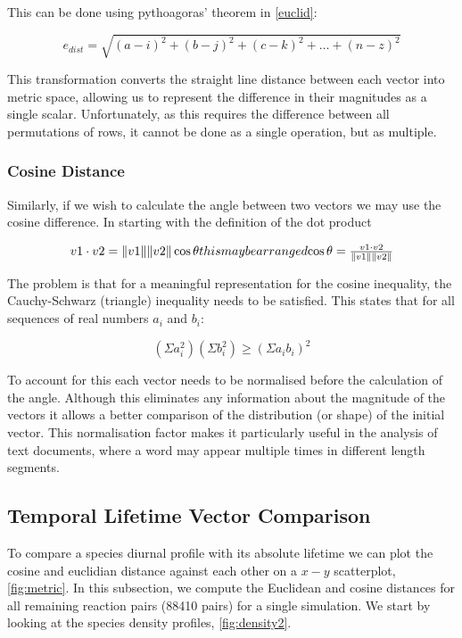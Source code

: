 This can be done using pythoagoras' theorem in \autoref{euclid}:

\begin{equation}
e_{dist}  = \sqrt{(a-i)^2 + (b-j)^2 + (c-k)^2 + \dots + (n-z)^2}
\label{euclid}
\end{equation}

This transformation converts the straight line distance between each vector into metric space, allowing us to represent the difference in their magnitudes as a single scalar. Unfortunately, as this requires the difference between all permutations of rows, it cannot be done as a single operation, but as multiple. 

\subsubsection{Cosine Distance}\label{sec:cosine}
Similarly, if we wish to calculate the angle between two vectors we may use the cosine difference. In starting with the definition of the dot product

\begin{equation}
v1 \cdot v2 = \|v1\|\|v2\| \cos \theta
$$this may be arranged$$
\cos \theta = \frac{ v1 \cdot v2}{\|v1\|\|v2\|}
\end{equation}

The problem is that for a meaningful representation for the cosine inequality, the Cauchy-Schwarz (triangle) inequality needs to be satisfied. This states that for all sequences of real numbers $a_i$ and $b_i$:

\begin{equation}
    (\Sigma a^2_i)(\Sigma b^2_i) \ge (\Sigma a_ib_i)^2
\end{equation}

To account for this each vector needs to be normalised before the calculation of the angle. Although this eliminates any information about the magnitude of the vectors it allows a better comparison of the distribution (or shape) of the initial vector. This normalisation factor makes it particularly useful in the analysis of text documents, where a word may appear multiple times in different length segments. 



\subsection{Temporal Lifetime Vector Comparison}

To compare a species diurnal profile with its absolute lifetime we can plot the cosine and euclidian distance against each other on a $x-y$ scatterplot, \autoref{fig:metric}. In this subsection, we compute the Euclidean and cosine distances for all remaining reaction pairs (88410 pairs) for a single simulation. We start by looking at the species density profiles, \autoref{fig:density2}.

